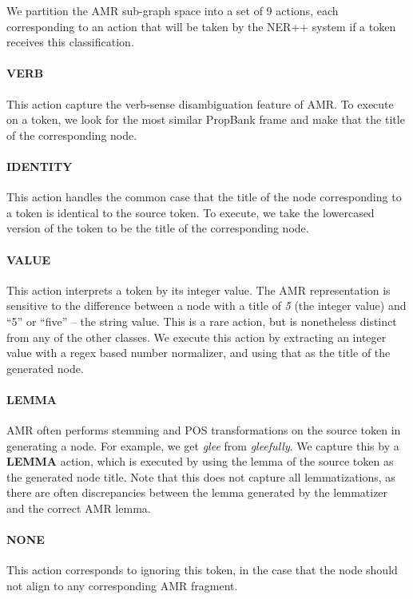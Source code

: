 \documentclass[11pt]{article}
\newcommand\w[1]{\textit{#1}} %
\newcommand\n[1]{\textit{#1}} %
\begin{document}

We partition the AMR sub-graph space into a set of 9 actions, each corresponding to an action that will be taken by the NER++ system if a token receives this classification.

\paragraph{VERB} This action capture the verb-sense disambiguation feature of AMR. To execute on a token, we look for the most similar PropBank frame and make that the title of the corresponding node.

\paragraph{IDENTITY} This action handles the common case that the title of the node corresponding to a token is identical to the source token. To execute, we take the lowercased version of the token to be the title of the corresponding node.

\paragraph{VALUE} This action interprets a token by its integer value. 
The AMR representation is sensitive to the difference between a node with a title
  of \n{5} (the integer value) and ``5'' or ``five'' -- the string value.
This is a rare action, but is nonetheless distinct from any of the other classes.
We execute this action by extracting an integer value with a regex based number normalizer, and using that as the title of the generated node.

\paragraph{LEMMA} AMR often performs stemming and POS transformations on the source token in generating a node. 
For example, we get \n{glee} from \w{gleefully}.
We capture this by a \textbf{LEMMA} action, which is executed by using the lemma of the source token as the generated node title.
Note that this does not capture all lemmatizations, as there are often discrepancies
  between the lemma generated by the lemmatizer and the correct AMR lemma.

\paragraph{NONE} This action corresponds to ignoring this token, in the case that
  the node should not align to any corresponding AMR fragment.
\end{document}

